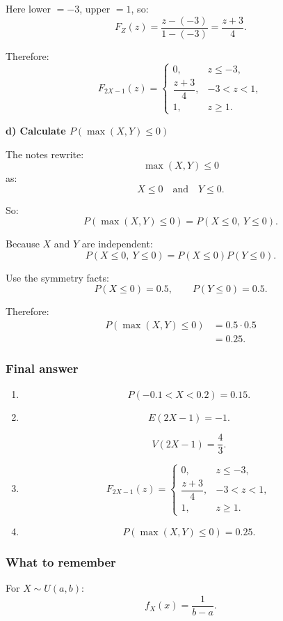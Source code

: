 \documentclass[10pt]{article}
\begin{document}
Here lower \(=-3\), upper \(=1\), so:
\[
F_Z(z)
=
\frac{z-(-3)}{1-(-3)}
=
\frac{z+3}{4}.
\]

Therefore:
\[
F_{2X-1}(z)=
\begin{cases}
0,
& z\le -3,\\
\dfrac{z+3}{4},
& -3<z<1,\\
1,
& z\ge 1.
\end{cases}
\]

\textbf{d) Calculate \(P(\max(X,Y)\le 0)\)}

The notes rewrite:
\[
\max(X,Y)\le 0
\]
as:
\[
X\le 0
\quad\text{and}\quad
Y\le 0.
\]

So:
\[
P(\max(X,Y)\le 0)
=
P(X\le 0,\ Y\le 0).
\]

Because \(X\) and \(Y\) are independent:
\[
P(X\le 0,\ Y\le 0)
=
P(X\le 0)P(Y\le 0).
\]

Use the symmetry facts:
\[
P(X\le 0)=0.5,
\qquad
P(Y\le 0)=0.5.
\]

Therefore:
\begin{align*}
P(\max(X,Y)\le 0)
&=
0.5\cdot 0.5
\\[2mm]
&=
0.25.
\end{align*}

\subsubsection*{Final answer}

\begin{enumerate}[label=\alph*)]
\item
\[
P(-0.1<X<0.2)=0.15.
\]

\item
\[
E(2X-1)=-1.
\]

\[
V(2X-1)=\frac43.
\]

\item
\[
F_{2X-1}(z)=
\begin{cases}
0,
& z\le -3,\\
\dfrac{z+3}{4},
& -3<z<1,\\
1,
& z\ge 1.
\end{cases}
\]

\item
\[
P(\max(X,Y)\le 0)=0.25.
\]
\end{enumerate}

\subsubsection*{What to remember}

For \(X\sim U(a,b)\):
\[
f_X(x)=\frac{1}{b-a}.
\]
\end{document}
